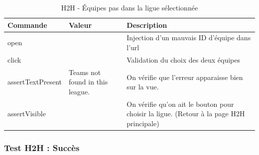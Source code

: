 \documentclass[a4paper,14pt]{extarticle}
\begin{document}
{\begin{table}[htp]
    \centering
    \begin{tabular}{|m{4cm}|m{4cm}|m{6cm}|}
    \hline
    \textbf{Commande} & \textbf{Valeur} & \textbf{Description}                                                                                                                              \\ \hline
    open              &                 & Injection d'un mauvais ID d'équipe dans l'url \\ \hline
    click             &                 & Validation du choix des deux équipes                                                                                                   \\ \hline
    assertTextPresent & Teams not found in this league. & On vérifie que l'erreur apparaisse bien sur la vue.                                                           \\ \hline
    assertVisible     &                 & On vérifie qu'on ait le bouton pour choisir la ligue. (Retour à la page H2H principale)                                                           \\ \hline
    \end{tabular}
    \label{tab:H2HEquipePasDansLigue}
    \caption{H2H - Équipes pas dans la ligue sélectionnée}
\end{table}

\newpage

\subsubsection{Test H2H : Succès}

}
\end{document}
